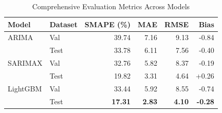 \documentclass[conference, 12pt, onecolumn]{IEEEtran}
\begin{document}
\begin{table}[H]
\centering
\caption{Comprehensive Evaluation Metrics Across Models}
\begin{tabular}{llrrrr}
\toprule
Model & Dataset & SMAPE (\%) & MAE & RMSE & Bias \\
\midrule
ARIMA & Val & 39.74 & 7.16 & 9.13 & -0.84 \\
                 & Test & 33.78 & 6.11 & 7.56 & -0.40 \\
SARIMAX & Val & 32.76 & 5.82 & 8.37 & -0.19 \\
                    & Test & 19.82 & 3.31 & 4.64 & +0.26 \\
LightGBM  & Val & 33.44 & 5.92 & 8.55 & -0.74 \\
                 & Test & \textbf{17.31} & \textbf{2.83} & \textbf{4.10} & \textbf{-0.28} \\
\bottomrule
\end{tabular}
\end{table}
\end{document}
